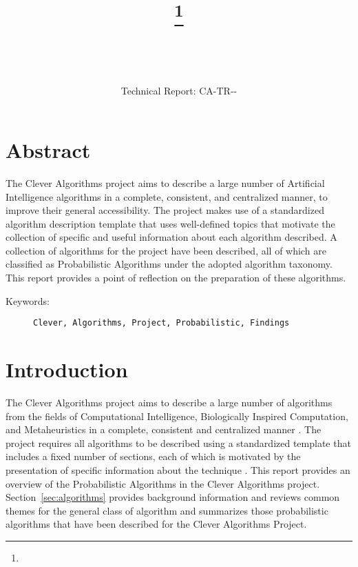 \documentclass[a4paper, 11pt]{article}
\title{{\myreporttitle}\footnote{\myreportlicense}}
\author{\myreportauthor\\{\myreportemail}\\\small\myreportproject}
\date{\myreportfulldate\\{\small{Technical Report: CA-TR-{\myreportdate}-\myreportversion}}}
\begin{document}
\maketitle

\section*{Abstract} 
The Clever Algorithms project aims to describe a large number of Artificial Intelligence algorithms in a complete, consistent, and centralized manner, to improve their general accessibility. 
The project makes use of a standardized algorithm description template that uses well-defined topics that motivate the collection of specific and useful information about each algorithm described.
A collection of algorithms for the project have been described, all of which are classified as Probabilistic Algorithms under the adopted algorithm taxonomy.
This report provides a point of reflection on the preparation of these algorithms.

\begin{description}
	\item[Keywords:] {\small\texttt{Clever, Algorithms, Project, Probabilistic, Findings}}
\end{description} 

\section{Introduction}
\label{sec:introduction}
The Clever Algorithms project aims to describe a large number of algorithms from the fields of Computational Intelligence, Biologically Inspired Computation, and Metaheuristics in a complete, consistent and centralized manner \cite{Brownlee2010}.
The project requires all algorithms to be described using a standardized template that includes a fixed number of sections, each of which is motivated by the presentation of specific information about the technique \cite{Brownlee2010a}.
This report provides an overview of the Probabilistic Algorithms in the Clever Algorithms project. 
Section~\ref{sec:algorithms} provides background information and reviews common themes for the general class of algorithm and summarizes those probabilistic algorithms that have been described for the Clever Algorithms Project.
\end{document}
